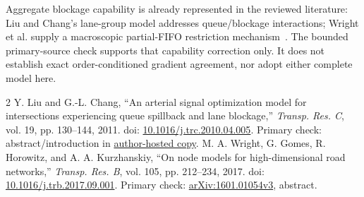 \documentclass[11pt]{article}
\begin{document}
Aggregate blockage capability is already represented in the reviewed literature: Liu and Chang's lane-group model addresses queue/blockage interactions; Wright et al. supply a macroscopic partial-FIFO restriction mechanism~\cite{liu,wright}. The bounded primary-source check supports that capability correction only. It does not establish exact order-conditioned gradient agreement, nor adopt either complete model here.

\begin{thebibliography}{2}
 Y. Liu and G.-L. Chang, ``An arterial signal optimization model for intersections experiencing queue spillback and lane blockage,'' \emph{Transp. Res. C}, vol. 19, pp. 130--144, 2011. doi: \href{https://doi.org/10.1016/j.trc.2010.04.005}{10.1016/j.trc.2010.04.005}. Primary check: abstract/introduction in \href{https://attap.umd.edu/wp-content/uploads/2022/05/TRC522.pdf}{author-hosted copy}.
 M. A. Wright, G. Gomes, R. Horowitz, and A. A. Kurzhanskiy, ``On node models for high-dimensional road networks,'' \emph{Transp. Res. B}, vol. 105, pp. 212--234, 2017. doi: \href{https://doi.org/10.1016/j.trb.2017.09.001}{10.1016/j.trb.2017.09.001}. Primary check: \href{https://arxiv.org/abs/1601.01054v3}{arXiv:1601.01054v3}, abstract.
\end{thebibliography}
\end{document}
